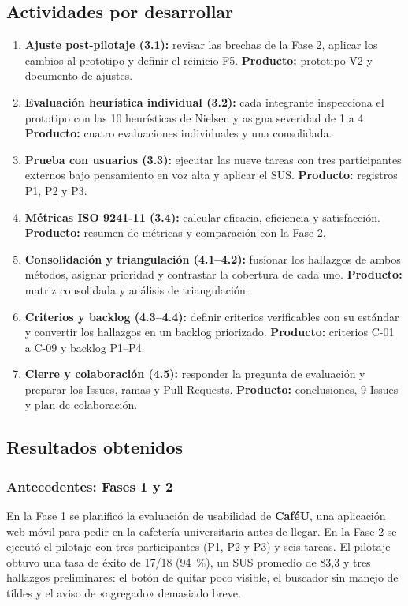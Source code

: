\documentclass{article}
\begin{document}
\subsection{Actividades por desarrollar}
\begin{enumerate}[leftmargin=1.5em, itemsep=2pt]
    \item \textbf{Ajuste post-pilotaje (3.1):} revisar las brechas de la Fase 2, aplicar los cambios al prototipo y definir el reinicio F5. \textbf{Producto:} prototipo V2 y documento de ajustes.
    \item \textbf{Evaluación heurística individual (3.2):} cada integrante inspecciona el prototipo con las 10 heurísticas de Nielsen y asigna severidad de 1 a 4. \textbf{Producto:} cuatro evaluaciones individuales y una consolidada.
    \item \textbf{Prueba con usuarios (3.3):} ejecutar las nueve tareas con tres participantes externos bajo pensamiento en voz alta y aplicar el SUS. \textbf{Producto:} registros P1, P2 y P3.
    \item \textbf{Métricas ISO 9241-11 (3.4):} calcular eficacia, eficiencia y satisfacción. \textbf{Producto:} resumen de métricas y comparación con la Fase 2.
    \item \textbf{Consolidación y triangulación (4.1--4.2):} fusionar los hallazgos de ambos métodos, asignar prioridad y contrastar la cobertura de cada uno. \textbf{Producto:} matriz consolidada y análisis de triangulación.
    \item \textbf{Criterios y backlog (4.3--4.4):} definir criterios verificables con su estándar y convertir los hallazgos en un backlog priorizado. \textbf{Producto:} criterios C-01 a C-09 y backlog P1--P4.
    \item \textbf{Cierre y colaboración (4.5):} responder la pregunta de evaluación y preparar los Issues, ramas y Pull Requests. \textbf{Producto:} conclusiones, 9 Issues y plan de colaboración.
\end{enumerate}

\subsection{Resultados obtenidos}

\subsubsection{Antecedentes: Fases 1 y 2}
En la Fase 1 se planificó la evaluación de usabilidad de \textbf{CaféU}, una aplicación web móvil para pedir en la cafetería universitaria antes de llegar. En la Fase 2 se ejecutó el pilotaje con tres participantes (P1, P2 y P3) y seis tareas. El pilotaje obtuvo una tasa de éxito de 17/18 (94~\%), un SUS promedio de 83,3 y tres hallazgos preliminares: el botón de quitar poco visible, el buscador sin manejo de tildes y el aviso de «agregado» demasiado breve.
\end{document}
